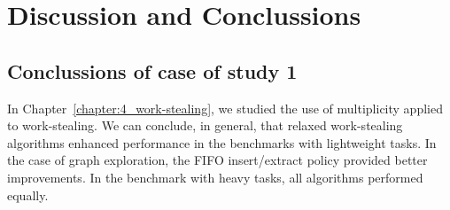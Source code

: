\chapter{Discussion and Conclussions}


\section{\label{sec:experiment-conclussions} Conclussions of case of study 1}

In Chapter~\ref{chapter:4_work-stealing}, we studied the use of multiplicity applied to work-stealing. We can conclude, in general, that relaxed work-stealing algorithms enhanced performance in the benchmarks with lightweight tasks. In the case of graph exploration, the FIFO insert/extract policy provided better improvements. In the benchmark with heavy tasks, all algorithms performed equally.

